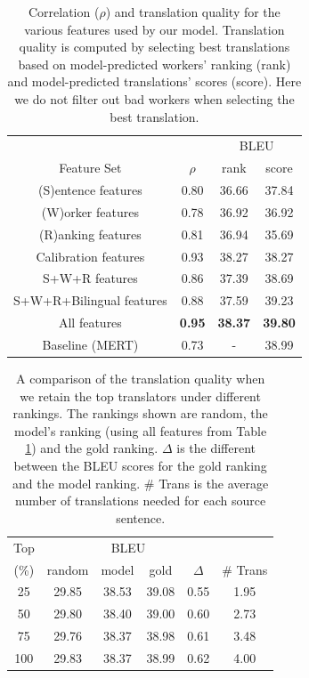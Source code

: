 \documentclass[11pt,letterpaper]{article}
\begin{document}
\begin{table}[htbp]
 \center
\begin{tabular}{c|c|cc}
\hline
 & & \multicolumn{2}{c}{BLEU}\\
Feature Set             & $\rho$  & rank & score    \\ \hhline{====}
(S)entence features     & 0.80 & 36.66 &37.84 \\
(W)orker features       & 0.78 & 36.92 &36.92 \\
(R)anking features      & 0.81 & 36.94 &35.69\\
Calibration features  & 0.93 & 38.27 &38.27\\
S+W+R features          & 0.86 & 37.39 & 38.69\\
S+W+R+Bilingual features        & 0.88 & 37.59 &39.23 \\
All features            & \textbf{0.95} & \textbf{38.37} & \textbf{39.80}\\ \hhline{====}
Baseline (MERT) &0.73&-&38.99\\ \hline
\end{tabular}
\caption{\label{lrresult} Correlation ($\rho$) and translation quality for the various features used by our model.  Translation quality is computed by selecting best translations based on model-predicted workers' ranking (rank) and model-predicted translations' scores (score). Here we do not filter out bad workers when selecting the best translation.}
\end{table}



\begin{table}[htbp]
\center
\begin{tabular}{c|ccccc}
\hline
Top & \multicolumn{4}{c}{BLEU}&\\
 (\%) &random & model & gold & $\Delta$ & \# Trans\\\hhline{======}
25      &29.85& 38.53   & 39.08      & 0.55   & 1.95         \\
50      &29.80& 38.40   & 39.00      & 0.60   & 2.73         \\
75      &29.76& 38.37   & 38.98      & 0.61   & 3.48         \\
100     &29.83& 38.37   & 38.99      & 0.62   & 4.00         \\ \hline
\end{tabular}
\caption{\label{modeltoprank} A comparison of the translation quality when we retain the top translators under different rankings.  The rankings shown are random, the model's ranking (using all features from Table \ref{lrresult}) and the gold ranking.  $\Delta$ is the different between the BLEU scores for the gold ranking and the model ranking. \# Trans is the average number of translations needed for each source sentence. 
}
\end{table} 
\end{document}
